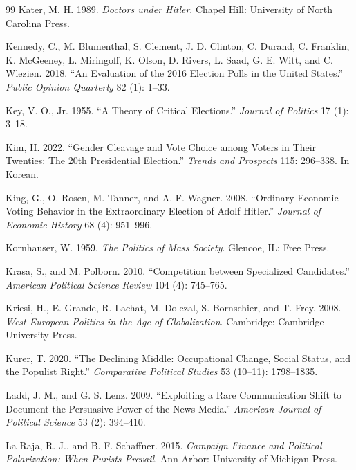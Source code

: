 \documentclass[12pt,letterpaper]{article}
\begin{document}
\begin{thebibliography}{99}
Kater, M. H. 1989. \textit{Doctors under Hitler}. Chapel Hill: University of North Carolina Press.

Kennedy, C., M. Blumenthal, S. Clement, J. D. Clinton, C. Durand, C. Franklin, K. McGeeney, L. Miringoff, K. Olson, D. Rivers, L. Saad, G. E. Witt, and C. Wlezien. 2018. ``An Evaluation of the 2016 Election Polls in the United States.'' \textit{Public Opinion Quarterly} 82 (1): 1--33.

Key, V. O., Jr. 1955. ``A Theory of Critical Elections.'' \textit{Journal of Politics} 17 (1): 3--18.

Kim, H. 2022. ``Gender Cleavage and Vote Choice among Voters in Their Twenties: The 20th Presidential Election.'' \textit{Trends and Prospects} 115: 296--338. In Korean.

King, G., O. Rosen, M. Tanner, and A. F. Wagner. 2008. ``Ordinary Economic Voting Behavior in the Extraordinary Election of Adolf Hitler.'' \textit{Journal of Economic History} 68 (4): 951--996.

Kornhauser, W. 1959. \textit{The Politics of Mass Society}. Glencoe, IL: Free Press.

Krasa, S., and M. Polborn. 2010. ``Competition between Specialized Candidates.'' \textit{American Political Science Review} 104 (4): 745--765.

Kriesi, H., E. Grande, R. Lachat, M. Dolezal, S. Bornschier, and T. Frey. 2008. \textit{West European Politics in the Age of Globalization}. Cambridge: Cambridge University Press.

Kurer, T. 2020. ``The Declining Middle: Occupational Change, Social Status, and the Populist Right.'' \textit{Comparative Political Studies} 53 (10--11): 1798--1835.

Ladd, J. M., and G. S. Lenz. 2009. ``Exploiting a Rare Communication Shift to Document the Persuasive Power of the News Media.'' \textit{American Journal of Political Science} 53 (2): 394--410.

La Raja, R. J., and B. F. Schaffner. 2015. \textit{Campaign Finance and Political Polarization: When Purists Prevail}. Ann Arbor: University of Michigan Press.


\end{thebibliography}
\end{document}

